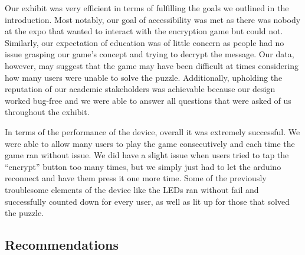 \documentclass[conference]{IEEEtran}
\begin{document}
\par Our exhibit was very efficient in terms of fulfilling the goals we outlined in the introduction. Most notably, our goal of accessibility was met as there was nobody at the expo that wanted to interact with the encryption game but could not. Similarly, our expectation of education was of little concern as people had no issue grasping our game’s concept and trying to decrypt the message. Our data, however, may suggest that the game may have been difficult at times considering how many users were unable to solve the puzzle. Additionally, upholding the reputation of our academic stakeholders was achievable because our design worked bug-free and we were able to answer all questions that were asked of us throughout the exhibit. 
    \par In terms of the performance of the device, overall it was extremely successful. We were able to allow many users to play the game consecutively and each time the game ran without issue. We did have a slight issue when users tried to tap the “encrypt” button too many times, but we simply just had to let the arduino reconnect and have them press it one more time. Some of the previously troublesome elements of the device like the LEDs ran without fail and successfully counted down for every user, as well as lit up for those that solved the puzzle. 


\subsection{Recommendations}
\end{document}
